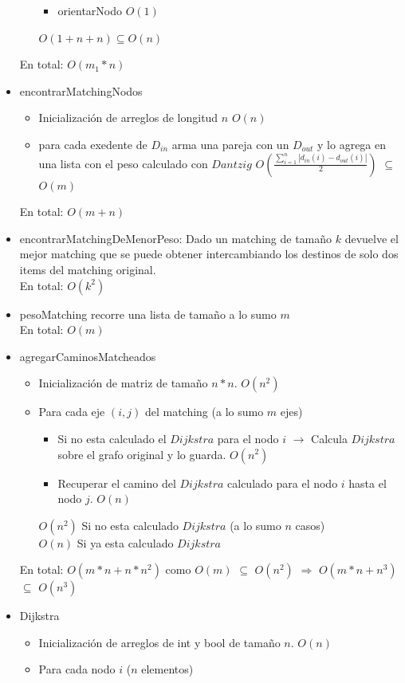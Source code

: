 \documentclass[11pt, a4paper, spanish]{article}
\begin{document}
\begin{itemize}
\begin{itemize}
\begin{itemize}
			\item orientarNodo $O(1)$
		\end{itemize}
		$O(1+ n+ n) \subseteq O(n)$
	\end{itemize}
	En total: $O(m_{1} * n)$
\newpage
	\item encontrarMatchingNodos
	\begin{itemize}
		\item Inicializaci\'on de arreglos de longitud $n$ $O(n)$
		\item para cada exedente de $D_{in}$ arma una pareja con un $D_{out}$ y lo agrega en una lista con el peso calculado con $Dantzig$ $O(\frac{\sum_{i=1}^{n}{|d_{in}(i)-d_{out}(i)|}}{2})$ $\subseteq$ $O(m)$
	\end{itemize}
	En total: $O(m + n)$
	\item encontrarMatchingDeMenorPeso: Dado un matching de tama\~{n}o $k$ devuelve el mejor matching que se puede obtener intercambiando los destinos de solo dos items del matching original. \\En total: $O(k^{2})$
	\item pesoMatching recorre una lista de tama\~{n}o a lo sumo $m$\\
	En total: $O(m)$
	\item agregarCaminosMatcheados
	\begin{itemize}
		\item Inicializaci\'on de matriz de tama\~{n}o $n*n$. $O(n^{2})$
		\item Para cada eje $(i,j)$ del matching (a lo sumo $m$ ejes)
		\begin{itemize}
			\item Si no esta calculado el $Dijkstra$ para el nodo $i$ $\rightarrow$ Calcula $Dijkstra$ sobre el grafo original y lo guarda. $O(n^{2})$
			\item Recuperar el camino del $Dijkstra$ calculado para el nodo $i$ hasta el nodo $j$. $O(n)$
		\end{itemize}
		$O(n^{2})$ Si no esta calculado $Dijkstra$ (a lo sumo $n$ casos)\\
		$O(n)$ Si ya esta calculado $Dijkstra$
	\end{itemize}
	En total: $O(m*n + n*n^{2})$ como $O(m)$ $\subseteq$ $O(n^{2})$ $\Rightarrow$ $O(m*n + n^{3})$ $\subseteq$ $O(n^{3})$
	\item Dijkstra
	\begin{itemize}
		\item Inicializaci\'on de arreglos de int y bool de tama\~{n}o $n$. $O(n)$
		\item Para cada nodo $i$ ($n$ elementos)

\end{itemize}
\end{itemize}
\end{document}
